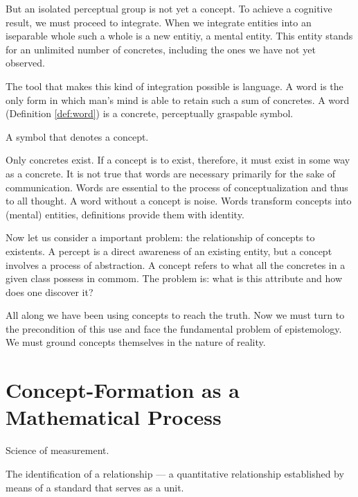         But an isolated perceptual group is not yet a concept. To achieve a cognitive result, we must proceed to integrate. When we integrate entities into an iseparable whole such a whole is a new entitiy, a mental entity. This entity stands for an unlimited number of concretes, including the ones we have not yet observed.

        The tool that makes this kind of integration possible is language. A word is the only form in which man's mind is able to retain such a sum of concretes. A word (Definition \ref{def:word}) is a concrete, perceptually graspable symbol.

            \begin{definition}[Word]
            \label{def:word}
                A symbol that denotes a concept.
            \end{definition}

        Only concretes exist. If a concept is to exist, therefore, it must exist in some way as a concrete. It is not true that words are necessary primarily for the sake of communication. Words are essential to the process of conceptualization and thus to all thought. A word without a concept is noise. Words transform concepts into (mental) entities, definitions provide them with identity.

        Now let us consider a important problem: the relationship of concepts to existents. A percept is a direct awareness of an existing entity, but a concept involves a process of abstraction. A concept refers to what all the concretes in a given class possess in commom. The problem is: what is this attribute and how does one discover it?

        All along we have been using concepts to reach the truth. Now we must turn to the precondition of this use and face the fundamental problem of epistemology. We must ground concepts themselves in the nature of reality.

    \section{Concept-Formation as a Mathematical Process}

            \begin{definition}[Mathematics]
            \label{def:mathematics}
                Science of measurement.
            \end{definition}

            \begin{definition}[Measurement]
            \label{def:measurement}
                The identification of a relationship — a quantitative relationship established by means of a standard that serves as a unit.
            \end{definition}


